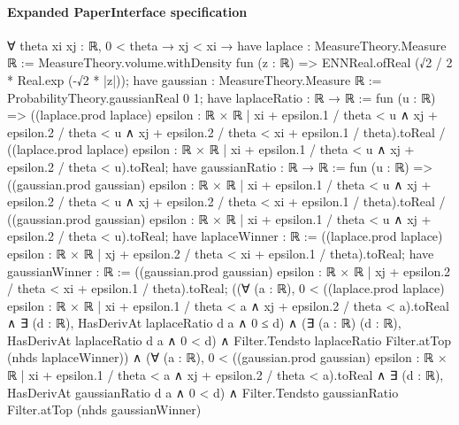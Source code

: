 \documentclass[10pt]{article}
\begin{document}
\paragraph{Expanded PaperInterface specification}
\begin{ReviewVerbatim}
∀ {theta xi xj : ℝ},
  0 < theta →
    xj < xi →
      have laplace : MeasureTheory.Measure ℝ :=
        MeasureTheory.volume.withDensity fun (z : ℝ) => ENNReal.ofReal (√2 / 2 * Real.exp (-√2 * |z|));
      have gaussian : MeasureTheory.Measure ℝ := ProbabilityTheory.gaussianReal 0 1;
      have laplaceRatio : ℝ → ℝ := fun (u : ℝ) =>
        ((laplace.prod laplace)
              {epsilon : ℝ × ℝ |
                xi + epsilon.1 / theta < u ∧
                  xj + epsilon.2 / theta < u ∧ xj + epsilon.2 / theta < xi + epsilon.1 / theta}).toReal /
          ((laplace.prod laplace) {epsilon : ℝ × ℝ | xi + epsilon.1 / theta < u ∧ xj + epsilon.2 / theta < u}).toReal;
      have gaussianRatio : ℝ → ℝ := fun (u : ℝ) =>
        ((gaussian.prod gaussian)
              {epsilon : ℝ × ℝ |
                xi + epsilon.1 / theta < u ∧
                  xj + epsilon.2 / theta < u ∧ xj + epsilon.2 / theta < xi + epsilon.1 / theta}).toReal /
          ((gaussian.prod gaussian) {epsilon : ℝ × ℝ | xi + epsilon.1 / theta < u ∧ xj + epsilon.2 / theta < u}).toReal;
      have laplaceWinner : ℝ :=
        ((laplace.prod laplace) {epsilon : ℝ × ℝ | xj + epsilon.2 / theta < xi + epsilon.1 / theta}).toReal;
      have gaussianWinner : ℝ :=
        ((gaussian.prod gaussian) {epsilon : ℝ × ℝ | xj + epsilon.2 / theta < xi + epsilon.1 / theta}).toReal;
      ((∀ (a : ℝ),
            0 <
                ((laplace.prod laplace)
                    {epsilon : ℝ × ℝ | xi + epsilon.1 / theta < a ∧ xj + epsilon.2 / theta < a}).toReal ∧
              ∃ (d : ℝ), HasDerivAt laplaceRatio d a ∧ 0 ≤ d) ∧
          (∃ (a : ℝ) (d : ℝ), HasDerivAt laplaceRatio d a ∧ 0 < d) ∧
            Filter.Tendsto laplaceRatio Filter.atTop (nhds laplaceWinner)) ∧
        (∀ (a : ℝ),
            0 <
                ((gaussian.prod gaussian)
                    {epsilon : ℝ × ℝ | xi + epsilon.1 / theta < a ∧ xj + epsilon.2 / theta < a}).toReal ∧
              ∃ (d : ℝ), HasDerivAt gaussianRatio d a ∧ 0 < d) ∧
          Filter.Tendsto gaussianRatio Filter.atTop (nhds gaussianWinner)
\end{ReviewVerbatim}
\end{document}
